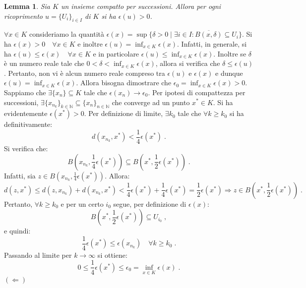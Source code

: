 \documentclass[a4paper,12pt]{report}
\theoremstyle{plain}
\newtheorem{lem}{Lemma}[section]
\theoremstyle{definition}
\theoremstyle{remark}
\numberwithin{equation}{section}
\begin{document}
\begin{lem} Sia $K$ un insieme compatto per successioni. Allora per ogni ricoprimento $u=\{U_i\}_{i \in I}$ di $K$ si ha $\epsilon(u)>0$.
\end{lem}
\proof $\forall x \in K$ consideriamo la quantità $\epsilon(x)=\sup\{\delta>0\;|\;\exists i \in I:\overline{B(x,\delta)}\subseteq U_i\}$. Si ha 
$\epsilon(x)>0 \quad \forall x \in K$ e inoltre $\epsilon(u)=\inf_{x \in K} \epsilon(x)$. Infatti, in generale, si ha $\epsilon(u)\le 
\epsilon(x) \quad \forall x \in K$ e in particolare $\epsilon(u)\le \inf_{x\in K} \epsilon(x)$. Inoltre se $\delta$ è un numero reale tale
 che $0<\delta<\inf_{x\in K}\epsilon(x)$, allora si verifica che $\delta \le \epsilon(u)$. Pertanto, non vi è alcun numero reale compreso 
tra $\epsilon(u)$ e $\epsilon(x)$ e dunque $\epsilon(u)=\inf_{x \in K} \epsilon(x)$. Allora bisogna dimostrare che $\epsilon_0=\inf_{x \in
 K} \epsilon(x)>0$. Sappiamo che $\exists \{x_n\} \subseteq K$ tale che $\epsilon(x_n)\to \epsilon_0$. Per ipotesi di compattezza per 
successioni, $\exists \{x_{n_k}\}_{k \in \mathbb{N}} \subseteq \{x_n\}_{n \in \mathbb{N}}$ che converge ad un punto $x^* \in K$. Si ha 
evidentemente $\epsilon(x^*)>0$. Per definizione di limite, $\exists k_0$ tale che $\forall k\ge k_0$ si ha definitivamente:
\begin{equation}
d(x_{n_k},x^*)<\frac{1}{4}\epsilon(x^*)\;.
\end{equation}
Si verifica che:
\begin{equation}
B\left(x_{n_k},\frac{1}{4}\epsilon(x^*)\right)\subseteq B\left(x^*,\frac{1}{2}\epsilon(x^*)\right)\;.
\end{equation}
Infatti, sia $z \in B\left(x_{n_k},\frac{1}{4}\epsilon(x^*)\right)$. Allora:
\begin{equation}
d(z,x^*) \le d(z,x_{n_k})+d(x_{n_k},x^*) < \frac{1}{4}\epsilon(x^*)+\frac{1}{4}\epsilon(x^*)=\frac{1}{2}\epsilon(x^*) \Longrightarrow 
z \in B\left(x^*,\frac{1}{2}\epsilon(x^*)\right)\;.
\end{equation}
Pertanto, $\forall k \ge k_0$ e per un certo $i_0$ segue, per definizione di $\epsilon(x)$:
\begin{equation}
B\left(x^*,\frac{1}{2}\epsilon(x^*)\right) \subseteq U_{i_0}\;,
\end{equation}
e quindi:
\begin{equation}
\frac{1}{4}\epsilon(x^*) \le \epsilon(x_{n_k}) \quad \forall k\ge k_0\;.
\end{equation}
Passando al limite per $k \to \infty$ si ottiene:
\begin{equation}
0 \le \frac{1}{4}\epsilon(x^*)\le \epsilon_0=\inf_{x \in K} \epsilon(x)\;.
\end{equation}
\endproof
\proof $(\Longleftarrow)$ \\
\end{document}
